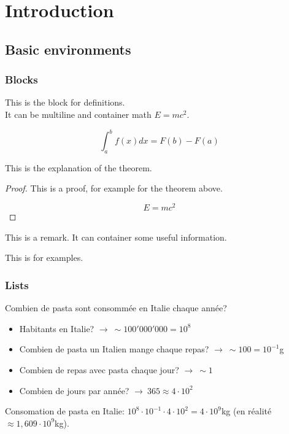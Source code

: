 \chapter{Introduction}
\section{Basic environments}

\subsection{Blocks}

\begin{definition}
    This is the block for definitions. \\
    It can be multiline and container math $E=mc^2$.

    $$ \int_a^b f(x) dx = F(b) - F(a) $$
\end{definition}

\begin{theorem}
    This is the explanation of the theorem.
\end{theorem}

\begin{proof}
    This is a proof, for example for the theorem above.

    $$ E = mc^2 $$
\end{proof}

\begin{remark}
    This is a remark. It can container some useful information.
\end{remark}

\begin{eg}
    This is for examples.
\end{eg}

\subsection{Lists}

\begin{eg}
    Combien de pasta sont consommée en Italie chaque année?

    \begin{itemize}
    \renewcommand\labelitemi{$\cdot$}
        \item Habitants en Italie? $\longrightarrow \ \sim 100'000'000 = 10^8$

        \item Combien de pasta un Italien mange chaque repas? $\longrightarrow \ \sim 100 = 10^{-1}$g

        \item Combien de repas avec pasta chaque jour? $\longrightarrow \ \sim 1$

        \item Combien de jours par année? $\longrightarrow \ 365 \approx 4 \cdot 10^2$
    \end{itemize}
    Consomation de pasta en Italie: $10^8 \cdot 10^{-1} \cdot 4 \cdot 10^2 = 4 \cdot 10^9$kg (en réalité $\approx 1,609 \cdot 10^9$kg).
\end{eg}

